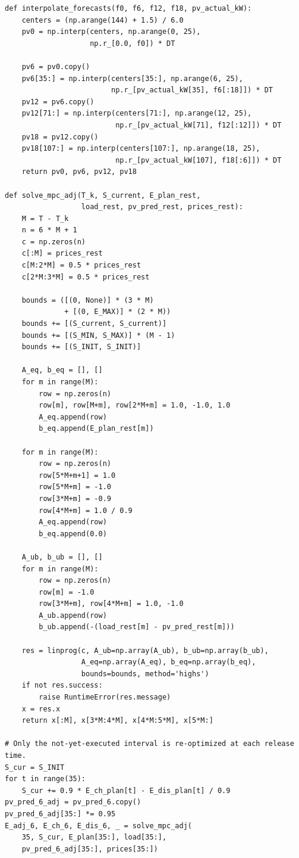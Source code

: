 \documentclass{cumcmthesis}
\begin{document}
\begin{lstlisting}[caption={问题三预测更新与 MPC 滚动核心代码节选},label={lst:q3_core}]
def interpolate_forecasts(f0, f6, f12, f18, pv_actual_kW):
    centers = (np.arange(144) + 1.5) / 6.0
    pv0 = np.interp(centers, np.arange(0, 25),
                    np.r_[0.0, f0]) * DT

    pv6 = pv0.copy()
    pv6[35:] = np.interp(centers[35:], np.arange(6, 25),
                         np.r_[pv_actual_kW[35], f6[:18]]) * DT
    pv12 = pv6.copy()
    pv12[71:] = np.interp(centers[71:], np.arange(12, 25),
                          np.r_[pv_actual_kW[71], f12[:12]]) * DT
    pv18 = pv12.copy()
    pv18[107:] = np.interp(centers[107:], np.arange(18, 25),
                          np.r_[pv_actual_kW[107], f18[:6]]) * DT
    return pv0, pv6, pv12, pv18

def solve_mpc_adj(T_k, S_current, E_plan_rest,
                  load_rest, pv_pred_rest, prices_rest):
    M = T - T_k
    n = 6 * M + 1
    c = np.zeros(n)
    c[:M] = prices_rest
    c[M:2*M] = 0.5 * prices_rest
    c[2*M:3*M] = 0.5 * prices_rest

    bounds = ([(0, None)] * (3 * M)
              + [(0, E_MAX)] * (2 * M))
    bounds += [(S_current, S_current)]
    bounds += [(S_MIN, S_MAX)] * (M - 1)
    bounds += [(S_INIT, S_INIT)]

    A_eq, b_eq = [], []
    for m in range(M):
        row = np.zeros(n)
        row[m], row[M+m], row[2*M+m] = 1.0, -1.0, 1.0
        A_eq.append(row)
        b_eq.append(E_plan_rest[m])

    for m in range(M):
        row = np.zeros(n)
        row[5*M+m+1] = 1.0
        row[5*M+m] = -1.0
        row[3*M+m] = -0.9
        row[4*M+m] = 1.0 / 0.9
        A_eq.append(row)
        b_eq.append(0.0)

    A_ub, b_ub = [], []
    for m in range(M):
        row = np.zeros(n)
        row[m] = -1.0
        row[3*M+m], row[4*M+m] = 1.0, -1.0
        A_ub.append(row)
        b_ub.append(-(load_rest[m] - pv_pred_rest[m]))

    res = linprog(c, A_ub=np.array(A_ub), b_ub=np.array(b_ub),
                  A_eq=np.array(A_eq), b_eq=np.array(b_eq),
                  bounds=bounds, method='highs')
    if not res.success:
        raise RuntimeError(res.message)
    x = res.x
    return x[:M], x[3*M:4*M], x[4*M:5*M], x[5*M:]

# Only the not-yet-executed interval is re-optimized at each release time.
S_cur = S_INIT
for t in range(35):
    S_cur += 0.9 * E_ch_plan[t] - E_dis_plan[t] / 0.9
pv_pred_6_adj = pv_pred_6.copy()
pv_pred_6_adj[35:] *= 0.95
E_adj_6, E_ch_6, E_dis_6, _ = solve_mpc_adj(
    35, S_cur, E_plan[35:], load[35:],
    pv_pred_6_adj[35:], prices[35:])


\end{lstlisting}
\end{document}
